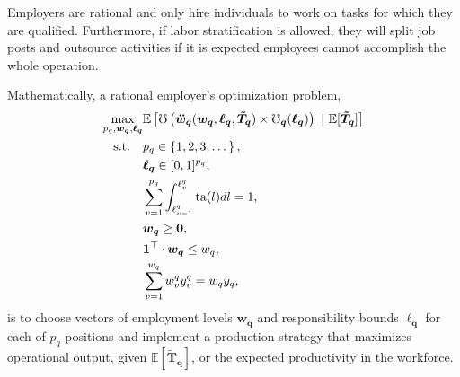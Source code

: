 \documentclass[hidelinks, nonatbib]{elsarticle}
\begin{document}
\begin{axiom}
    \label{era}
    Employers are rational and only hire individuals to work on tasks for which they are qualified. Furthermore, if labor stratification is allowed, they will split job posts and outsource activities if it is expected employees cannot accomplish the whole operation.

    Mathematically, a rational employer's optimization problem,
    \begin{align}
        \max_{
            p_q,
            \boldsymbol{w_q},
            \boldsymbol{\ell_q}
        }
            &
            \mathbb{E}\left[
                \mho\left(
                    \boldsymbol{\ddot{w}_{q}}(
                        \boldsymbol{w_{q}},
                        \boldsymbol{\ell_{q}},
                        \boldsymbol{\tilde{T}_{q}}
                    )
                    \times
                    \boldsymbol{
                        \mho_q
                    }(
                        \boldsymbol{\ell_q}
                    )
                \right)
                \
                |
                \
                \mathbb{E}[
                    \boldsymbol{\tilde{T}_q}
                ]
            \right]
            \\
            \text{s.t.}
            \quad
            &
            p_q \in \left\{1, 2, 3, \dots\right\}
            ,
            \\
            &
            \boldsymbol{\ell_q} \in [0,1] ^ {p_q}
            ,
            \\
            &
            \sum_{v=1}^{p_q}{
                \int_{
                    \ell_{v-1}^{q}
                }^{
                    \ell_{v}^{q}
                }
                \text{ta}(l)dl
            }
            =
            1
            ,
            \\
            &
            \boldsymbol{w_{q}} \geq \boldsymbol{0}
            ,
            \\
            &
            \boldsymbol{1} ^ {\top}
            \cdot
            \boldsymbol{w_q}
            \leq
            w_q
            ,
            \\
            &
            \sum_{v=1}^{w_q}
            w_{v}^{q}
            y_{v}^{q}
            =
            w_q
            y_q
            ,
    \end{align}
    is to choose vectors of employment levels $\boldsymbol{w_q}$ and responsibility bounds $\boldsymbol{\ell_q}$ for each of $p_q$ positions and implement a production strategy that maximizes operational output, given $\mathbb{E}[\boldsymbol{\tilde{T}_q}]$, or the expected productivity in the workforce.
\end{axiom}
\end{document}
